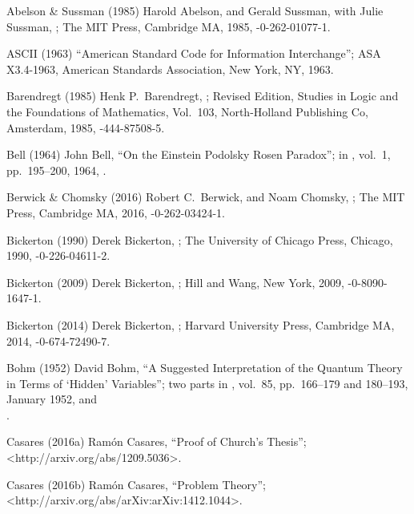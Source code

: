 

 Abelson \& Sussman (1985)
Harold Abelson, and Gerald Sussman, with Julie Sussman,
;
The MIT Press, Cambridge MA, 1985,
-0-262-01077-1.

 ASCII (1963)
``American Standard Code for Information Interchange'';
ASA X3.4-1963,
American Standards Association, New York, NY, 1963.

 Barendregt (1985)
Henk P.\ Barendregt,
;
Revised Edition, Studies in Logic and the Foundations of Mathematics,
Vol.\ 103, North-Holland Publishing Co, Amsterdam, 1985,
-444-87508-5.

 Bell (1964)
John Bell,
``On the Einstein Podolsky Rosen Paradox'';
in ,
vol.\ 1, pp.\ 195--200, 1964,
.

 Berwick \& Chomsky (2016)
Robert C.\ Berwick, and Noam Chomsky,
;
The MIT Press, Cambridge MA, 2016,
-0-262-03424-1.

 Bickerton (1990)
Derek Bickerton,
;
The University of Chicago Press, Chicago, 1990,
-0-226-04611-2.

 Bickerton (2009)
Derek Bickerton,
;
Hill and Wang, New York, 2009,
-0-8090-1647-1.

 Bickerton (2014)
Derek Bickerton,
;
Harvard University Press, Cambridge MA, 2014,
-0-674-72490-7.

 Bohm (1952)
David Bohm,
``A Suggested Interpretation of the Quantum Theory
in Terms of `Hidden' Variables''; two parts
in ,
vol.\ 85, pp.\ 166--179 and 180--193, January 1952,
 and\\
.

 Casares (2016a)
Ram\'on Casares,
``Proof of Church's Thesis'';
<http://arxiv.org/abs/1209.5036>.

 Casares (2016b)
Ram\'on Casares,
``Problem Theory'';
<http://arxiv.org/abs/arXiv:arXiv:1412.1044>.

